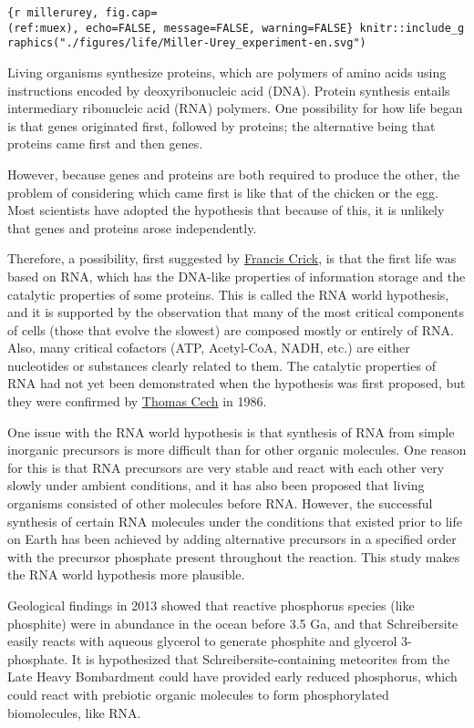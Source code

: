 \documentclass[
]{article}
\begin{document}
\texttt{\{r\ millerurey,\ fig.cap=\textquotesingle{}(ref:muex)\textquotesingle{},\ echo=FALSE,\ message=FALSE,\ warning=FALSE\}\ knitr::include\_graphics("./figures/life/Miller-Urey\_experiment-en.svg")}

Living organisms synthesize proteins, which are polymers of amino acids
using instructions encoded by deoxyribonucleic acid (DNA). Protein
synthesis entails intermediary ribonucleic acid (RNA) polymers. One
possibility for how life began is that genes originated first, followed
by proteins; the alternative being that proteins came first and then
genes.

However, because genes and proteins are both required to produce the
other, the problem of considering which came first is like that of the
chicken or the egg. Most scientists have adopted the hypothesis that
because of this, it is unlikely that genes and proteins arose
independently.

Therefore, a possibility, first suggested by
\href{https://en.wikipedia.org/wiki/Francis_Crick}{Francis Crick}, is
that the first life was based on RNA, which has the DNA-like properties
of information storage and the catalytic properties of some proteins.
This is called the RNA world hypothesis, and it is supported by the
observation that many of the most critical components of cells (those
that evolve the slowest) are composed mostly or entirely of RNA. Also,
many critical cofactors (ATP, Acetyl-CoA, NADH, etc.) are either
nucleotides or substances clearly related to them. The catalytic
properties of RNA had not yet been demonstrated when the hypothesis was
first proposed, but they were confirmed by
\href{https://en.wikipedia.org/wiki/Thomas_Cech}{Thomas Cech} in 1986.

One issue with the RNA world hypothesis is that synthesis of RNA from
simple inorganic precursors is more difficult than for other organic
molecules. One reason for this is that RNA precursors are very stable
and react with each other very slowly under ambient conditions, and it
has also been proposed that living organisms consisted of other
molecules before RNA. However, the successful synthesis of certain RNA
molecules under the conditions that existed prior to life on Earth has
been achieved by adding alternative precursors in a specified order with
the precursor phosphate present throughout the reaction. This study
makes the RNA world hypothesis more plausible.

Geological findings in 2013 showed that reactive phosphorus species
(like phosphite) were in abundance in the ocean before 3.5 Ga, and that
Schreibersite easily reacts with aqueous glycerol to generate phosphite
and glycerol 3-phosphate. It is hypothesized that
Schreibersite-containing meteorites from the Late Heavy Bombardment
could have provided early reduced phosphorus, which could react with
prebiotic organic molecules to form phosphorylated biomolecules, like
RNA.
\end{document}
